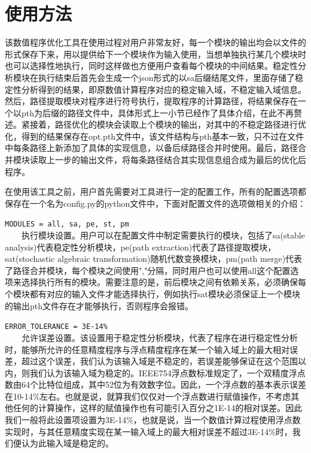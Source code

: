\section{使用方法}

该数值程序优化工具在使用过程对用户非常友好，每一个模块的输出均会以文件的形式保存下来，用以提供给下一个模块作为输入使用，当想单独执行某几个模块时也可以选择性地执行，同时这样做也方便用户查看每个模块的中间结果。稳定性分析模块在执行结束后首先会生成一个json形式的以sa后缀结尾文件，里面存储了稳定性分析得到的结果，即原数值计算程序对应的稳定输入域，不稳定输入域信息。然后，路径提取模块对程序进行符号执行，提取程序的计算路径，将结果保存在一个以pth为后缀的路径文件中，具体形式上一小节已经作了具体介绍，在此不再赘述。紧接着，路径优化的模块会读取上个模块的输出，对其中的不稳定路径进行优化，得到的结果保存在opt.pth文件中，该文件结构与pth基本一致，只不过在文件中每条路径上新添加了具体的实现信息，以备后续路径合并时使用。最后，路径合并模块读取上一步的输出文件，将每条路径结合其实现信息组合成为最后的优化后程序。

在使用该工具之前，用户首先需要对工具进行一定的配置工作，所有的配置选项都保存在一个名为config.py的python文件中，下面对配置文件的选项做相关的介绍：

\texttt{MODULES = all, sa, pe, st, pm}\\
　　执行模块设置。用户可以在配置文件中制定需要执行的模块，包括了sa(stable analysis)代表稳定性分析模块，pe(path extraction)代表了路径提取模块，sat(stochastic algebraic transformation)随机代数变换模块，pm(path merge)代表了路径合并模块，每个模块之间使用","分隔，同时用户也可以使用all这个配置选项来选择执行所有的模块。需要注意的是，前后模块之间有依赖关系，必须确保每个模块都有对应的输入文件才能选择执行，例如执行sat模块必须保证上一个模块的输出pth文件存在才能够执行，否则程序会报错。

\texttt{ERROR\_TOLERANCE = 3E-14\%}\\
　　允许误差设置。该设置用于稳定性分析模块，代表了程序在进行稳定性分析时，能够所允许的任意精度程序与浮点精度程序在某一个输入域上的最大相对误差，超过这个误差，我们认为该输入域是不稳定的，若误差能够保证在这个范围以内，则我们认为该输入域为稳定的。IEEE754浮点数标准规定了，一个双精度浮点数由64个比特位组成，其中52位为有效数字位。因此，一个浮点数的基本表示误差在10-14\%左右。也就是说，就算我们仅仅对一个浮点数进行赋值操作，不考虑其他任何的计算操作，这样的赋值操作也有可能引入百分之1E-14的相对误差。因此我们一般将此设置项设置为3E-14\%，也就是说，当一个数值计算过程使用浮点数实现时，与其任意精度实现在某一输入域上的最大相对误差不超过3E-14\%时，我们便认为此输入域是稳定的。

